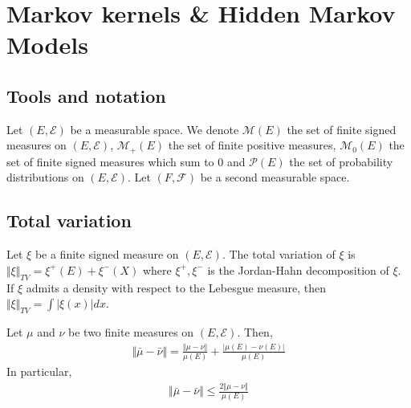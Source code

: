\section{Markov kernels \& Hidden Markov Models}\label{sec:markov}


\subsection{Tools and notation}
Let $(E, \mathcal E)$ be a measurable space. We denote $\mathcal M(E)$ the set of finite signed measures on $(E, \mathcal E)$, $\mathcal M_+(E)$ the set of finite positive measures, $\mathcal M_0(E)$ the set of finite signed measures which sum to $0$ and $\mathcal P(E)$ the set of probability distributions on $(E, \mathcal E)$. Let $(F, \mathcal F)$ be a second measurable space.

\subsection{Total variation}

\begin{definition}
Let $\xi$ be a finite signed measure on $(E, \mathcal E)$. The total variation of $\xi$ is $\Vert \xi \Vert_{TV}= \xi^+(E) + \xi^-(X)$ where $\xi^+, \xi^-$ is the Jordan-Hahn decomposition of $\xi$. If $\xi$ admits a density with respect to the Lebesgue measure, then $\Vert \xi \Vert_{TV} = \int \vert \xi(x)\vert dx$.
\end{definition}
\begin{proposition} Let $\mu$ and $\nu$ be two finite measures on $(E, \mathcal E)$. Then,
\begin{align}
    \Vert \bar \mu - \bar \nu \Vert = \frac{\Vert \mu - \nu \Vert}{\mu(E)} + \frac{\vert \mu(E) - \nu(E)\vert}{\mu(E)}
\end{align}
In particular,
\begin{align}
    \Vert \bar \mu - \bar \nu \Vert \leq \frac{2\Vert \mu - \nu \Vert}{\mu(E)}
\end{align}
\end{proposition}
